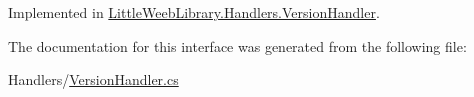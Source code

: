 Implemented in \mbox{\hyperlink{class_little_weeb_library_1_1_handlers_1_1_version_handler_ad4dc752be10a1b3cc2d546dc1d4d6bff}{Little\+Weeb\+Library.\+Handlers.\+Version\+Handler}}.



The documentation for this interface was generated from the following file\+:\begin{DoxyCompactItemize}
\item 
Handlers/\mbox{\hyperlink{_version_handler_8cs}{Version\+Handler.\+cs}}\end{DoxyCompactItemize}
